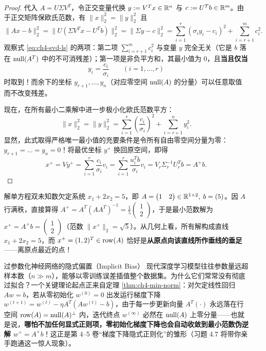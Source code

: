 \begin{proof}
代入 $A = U\Sigma V^T$，令正交变量代换 $y := V^T x \in \mathbb{R}^n$ 与 $c := U^T b \in \mathbb{R}^m$。由于正交矩阵保欧氏范数，有 $\|x\|_2^2 = \|y\|_2^2$ 且
\begin{equation}
  \|Ax - b\|_2^2 = \|U(\Sigma V^T x - U^T b)\|_2^2 = \|\Sigma y - c\|_2^2
  = \sum_{i=1}^r (\sigma_i y_i - c_i)^2 + \sum_{i=r+1}^m c_i^2. \label{eq:ch4-svd-ls}
\end{equation}
观察式 \eqref{eq:ch4-svd-ls} 的两项：第二项 $\sum_{i=r+1}^m c_i^2$ 与变量 $y$ 完全无关（它是 $b$ 落在 $\operatorname{null}(A^T)$ 中的不可消残差）；第一项是非负平方和，其最小值为 $0$，且\textbf{当且仅当}
\[
  y_i = \frac{c_i}{\sigma_i} \qquad (i = 1, \dots, r)
\]
时取到！而余下的坐标 $y_{r+1}, \dots, y_n$（对应零空间 $\operatorname{null}(A)$ 的分量）可以任意取值而不改变残差。

现在，在所有最小二乘解中进一步极小化欧氏范数平方：
\[
  \|x\|_2^2 = \|y\|_2^2 = \sum_{i=1}^r \left(\frac{c_i}{\sigma_i}\right)^2 + \sum_{i=r+1}^n y_i^2.
\]
显然，此式取得严格唯一最小值的充要条件是令所有自由零空间分量为零：$y_{r+1} = \dots = y_n = 0$！将最优坐标 $y^+$ 换回原空间，即得
\[
  x^+ = V y^+ = \sum_{i=1}^r \frac{c_i}{\sigma_i} v_i = \sum_{i=1}^r \frac{u_i^T b}{\sigma_i} v_i = V_r \Sigma_r^{-1} U_r^T b = A^+ b.
\]
\end{proof}

\begin{example}[二维欠定方程的最小范数解]
\label{ex:ch4-underdet}
解单方程双未知数欠定系统 $x_1 + 2x_2 = 5$，即 $A = \begin{pmatrix}1 & 2\end{pmatrix} \in \mathbb{R}^{1\times 2},\; b = (5)$。因 $A$ 行满秩，直接算得 $A^+ = A^T(AA^T)^{-1} = \frac{1}{5}\begin{pmatrix}1\\2\end{pmatrix}$，于是最小范数解为 $x^+ = A^+ b = \begin{pmatrix}1\\2\end{pmatrix}$（范数 $\|x^+\|_2 = \sqrt{5}$）。从几何上看，所有解构成直线 $x_1 + 2x_2 = 5$，而 $x^+ = (1,2)^T \in \operatorname{row}(A)$ 恰好是\textbf{从原点向该直线所作垂线的垂足}——离原点最近的点！
\end{example}

\begin{insightBox}{过参数化神经网络的隐式偏置（Implicit Bias）}
现代深度学习模型往往参数量远超样本数（$n \gg m$），能够以零训练误差插值整个数据集。为什么它们常常没有彻底过拟合？一个关键理论起点正来自定理 \ref{thm:ch4-min-norm}：对欠定线性回归 $Aw = b$，若从零初始化 $w^{(0)} = 0$ 出发运行梯度下降 $w^{(t+1)} = w^{(t)} - \eta A^T(Aw^{(t)} - b)$，由于每一步更新向量 $A^T(\cdot)$ 永远落在行空间 $\operatorname{row}(A) = \operatorname{null}(A)^\perp$ 内，迭代终点 $w^{(\infty)}$ 必然在 $\operatorname{null}(A)$ 上零分量——也就是说，\textbf{哪怕不加任何显式正则项，零初始化梯度下降也会自动收敛到最小范数伪逆解 $w^+ = A^+ b$}！这正是第 4--5 卷“梯度下降隐式正则化”的雏形（习题 4.7 将带你亲手跑通这一惊人现象）。
\end{insightBox}

